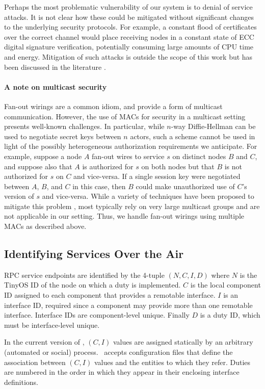 Perhaps the most problematic vulnerability of our system is to denial of
service attacks. It is not clear how these could be mitigated without
significant changes to the underlying security protocols. For example, a
constant flood of certificates over the correct channel would place
receiving nodes in a constant state of ECC digital signature
verification, potentially consuming large amounts of CPU time and
energy. Mitigation of such attacks is outside the scope of this work but
has been discussed in the literature \cite{4431860}.

\paragraph{A note on multicast security} Fan-out wirings are a common idiom, 
and provide a form of multicast communication. However, the use of
MACs for security in a multicast setting presents well-known
challenges. In particular, while $n$-way Diffie-Hellman can be used to
negotiate secret keys between $n$ actors, such a scheme cannot be used
in light of the possibly heterogeneous authorization requirements we
anticipate. For example, suppose a node $A$ fan-out wires to service
$s$ on distinct nodes $B$ and $C$, and suppose also that $A$ is
authorized for $s$ on both nodes but that $B$ is not authorized for
$s$ on $C$ and vice-versa. If a single session key were negotiated
between $A$, $B$, and $C$ in this case, then $B$ could make
unauthorized use of $C$'s version of $s$ and vice-versa. While a
variety of techniques have been proposed to mitigate this problem
\cite{canetti-1999}, most typically rely on very large multicast
groups and are not applicable in our setting. Thus, we handle fan-out
wirings using multiple MACs as described above.

\subsection{Identifying Services Over the Air}

RPC service endpoints are identified by the 4-tuple $(N, C, I, D)$
where $N$ is the TinyOS ID of the node on which a duty is
implemented. $C$ is the local component ID assigned to each component
that provides a remotable interface. $I$ is an interface ID, required
since a component may provide more than one remotable
interface. Interface IDs are component-level unique. Finally $D$ is a
duty ID, which must be interface-level unique.

In the current version of \Sprocket, $(C, I)$ values are assigned
statically by an arbitrary (automated or social) process. \Sprocket\
accepts configuration files that define the association between $(C, I)$
values and the entities to which they refer. Duties are numbered in the
order in which they appear in their enclosing interface definitions.

